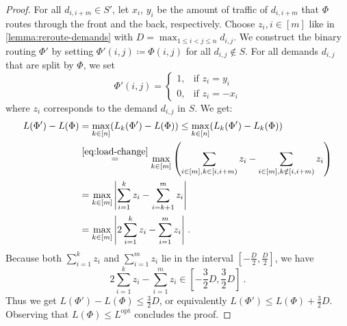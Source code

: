 \begin{proof}
	For all $d_{i, i+m} \in S'$, let $x_i$, $y_i$ be the amount of traffic of $d_{i, i+m}$ that $\Phi$ routes through the front and the back, respectively.
	Choose $z_i, i \in [m]$ like in \cref{lemma:reroute-demands} with $D = \max_{1 \leq i < j \leq n} d_{i, j}$.
	We construct the binary routing $\Phi'$ by setting $\Phi'(i, j) \coloneqq \Phi(i, j)$ for all $d_{i,j} \notin S$.
	For all demands $d_{i, j}$ that are split by $\Phi$, we set
	\begin{equation}
		\Phi'(i, j) = \begin{cases}
			1, & \text{if } z_i = y_i \\
			0, & \text{if } z_i = -x_i
		\end{cases}
	\end{equation}
	where $z_i$ corresponds to the demand $d_{i, j}$ in $S$.
	We get:
	\begin{align}
		L(\Phi') - L(\Phi) &= \max_{k \in [n]} (L_k(\Phi') - L(\Phi)) 
		\leq \max_{k \in [n]} (L_k(\Phi') - L_k(\Phi))\\
		& \stackrel{\ref{eq:load-change}}{=} \max_{k \in [m]} \left(\sum_{i \in [m], k \in [i, i+m)} z_i - \sum_{i \in [m], k \notin [i, i+m)} z_i\right)\\
		&= \max_{k \in [m]} \abs{\sum_{i = 1}^k z_i - \sum_{i = k+1}^m z_i }\\
		&= \max_{k \in [m]} \abs{2\sum_{i = 1}^k z_i - \sum_{i = 1}^m z_i } \ . \label{eq:partial-reroutes}
	\end{align}
	Because both $\sum_{i = 1}^k z_i$ and $\sum_{i = 1}^m z_i$ lie in the interval $[-\frac{D}{2}, \frac{D}{2}]$, 
	we have 
	\begin{equation}
		2\sum_{i = 1}^k z_i - \sum_{i = 1}^m z_i \in [-\frac{3}{2}D, \frac{3}{2}D] \ .
	\end{equation}
	Thus we get $L(\Phi') - L(\Phi) \leq \frac{3}{2}D$, or equivalently $L(\Phi') \leq L(\Phi) + \frac{3}{2}D$.
	Observing that $L(\Phi) \leq L^\mathrm{opt}$ concludes the proof.
\end{proof}